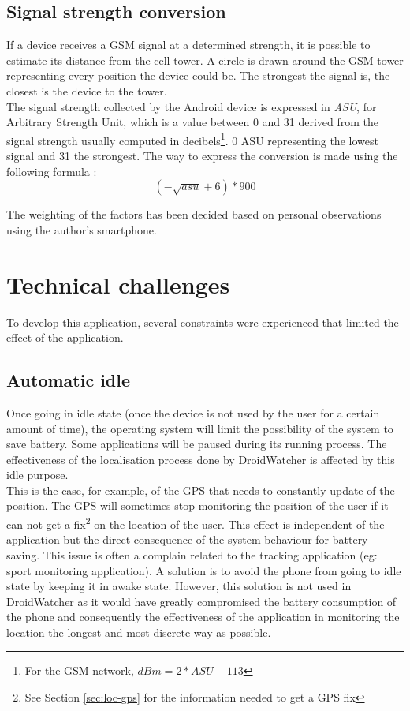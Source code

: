 
\subsection{Signal strength conversion}

If a device receives a GSM signal at a determined strength, it is possible to estimate its distance from the cell tower.
A circle is drawn around the GSM tower representing every position the device could be.
The strongest the signal is, the closest is the device to the tower.\\

The signal strength collected by the Android device is expressed in \emph{ASU}, for Arbitrary Strength Unit, which is a value between 0 and 31 derived from the signal strength usually computed in decibels\footnote{For the GSM network, $dBm = 2 * ASU - 113$}.
0 ASU representing the lowest signal and 31 the strongest.
The way to express the conversion is made using the following formula :\\

\[
 (-\sqrt{asu}+6)*900
\]

The weighting of the factors has been decided based on personal observations using the author's smartphone.

\section{Technical challenges}

To develop this application, several constraints were experienced that limited the effect of the application.

\subsection{Automatic idle}

Once going in idle state (once the device is not used by the user for a certain amount of time), the operating system will limit the possibility of the system to save battery.
Some applications will be paused during its running process.
The effectiveness of the localisation process done by DroidWatcher is affected by this idle purpose.\\

This is the case, for example, of the GPS that needs to constantly update of the position.
The GPS will sometimes stop monitoring the position of the user if it can not get a fix\footnote{See Section \ref{sec:loc-gps} for the information needed to get a GPS fix} on the location of the user.
This effect is independent of the application but the direct consequence of the system behaviour for battery saving. 
This issue is often a complain related to the tracking application (eg: sport monitoring application).
A solution is to avoid the phone from going to idle state by keeping it in awake state.
However, this solution is not used in DroidWatcher as it would have greatly compromised the battery consumption  of the phone and consequently the effectiveness of the application in monitoring the location the longest and most discrete way as possible.


